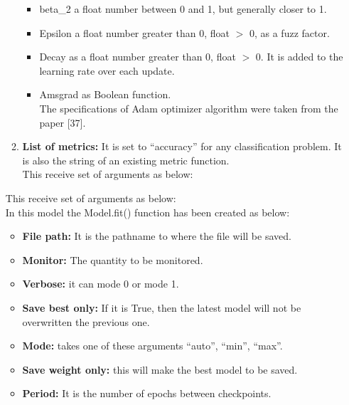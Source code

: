 \begin{itemize}
\begin{enumerate}
\begin{itemize}
            \item beta\_2 a float number between 0 and 1, but generally closer to 1.
            \item Epsilon a float number greater than 0, float $>$ 0, as a fuzz factor.
            \item Decay as a float number greater than 0, float $>$ 0. It is added to the learning rate over each update.
            \item Amsgrad as Boolean function.\\
            The specifications of Adam optimizer algorithm were taken from the paper [37].
        \end{itemize}
        \item \textbf{List of metrics:} It is set to “accuracy” for any classification problem. It is also the string of an existing metric function.\\
        This receive set of arguments as below:
    \end{enumerate}
    This receive set of arguments as below:\\
    \noindent{}
 In this model the Model.fit() function has been created as below:
\begin{itemize}
    \item \textbf{File path:} It is the pathname to where the file will be saved.
    \item \textbf{Monitor:} The quantity to be monitored.
    \item \textbf{Verbose:} it can mode 0 or mode 1.
    \item \textbf{Save best only:} If it is True, then the latest model will not be overwritten the previous one.
    \item \textbf{Mode:} takes one of these arguments “auto”, “min”, “max”.
    \item \textbf{Save weight only:} this will make the best model to be saved.
    \item \textbf{Period:} It is the number of epochs between checkpoints.

\end{itemize}
\end{itemize}
